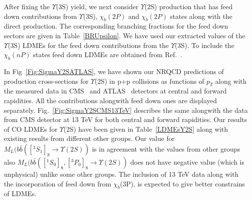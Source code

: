 After fixing the $\Upsilon$(3S) yield, we next consider $\Upsilon$(2S) production 
that has feed down contributions from $\Upsilon$(3S), $\chi_b(2P)$ and $\chi_b(2P)$ states
along with the direct production. The corresponding
branching fractions for the feed down sectors are given in
Table~\ref{BRUpsilon}. We have used our extracted values of the $\Upsilon$(3S) LDMEs
for the feed down contributions from the $\Upsilon$(3S). To include the $\chi_b(nP)$ states feed down
LDMEs are obtained from Ref.~\cite{Sharma:2012dy,Feng:2015wka}.

In Fig~\ref{Fig:SigmaY2SATLAS}, we have shown our NRQCD predictions of production
cross-sections for $\Upsilon$(2S) in p+p collisions as functions of 
$p_T$ along with the measured data in CMS~\cite{Chatrchyan:2013yna} and ATLAS~\cite{Aad:2012dlq}
detectors at central and forward rapidities. All the contributions
alongwith feed down ones are displayed separately. Fig.~\ref{Fig:SigmaY2SCMS13TeV} describes 
the same alongwith the data from CMS detector at 13 TeV for 
both central and forward rapidities. Our results of CO LDMEs for 
$\Upsilon$(2S) have been given in Table~\ref{LDMEsY2S} along with existing results
from different other groups.
Our value for $M_L(b\bar{b}([^3S_1]_8 \rightarrow \Upsilon(2S))$ is in agreement with the
values from other groups also $M_L(b\bar{b}([^1S_0]_8,[^3P_0]_8 \rightarrow \Upsilon(2S))$
does not have negative value (which is unphysical) unlike some other groups.
The inclusion of 13 TeV data along with the incorporation of feed down from $\chi_{b}$(3P),
is expected to give better constrains of LDMEs.

